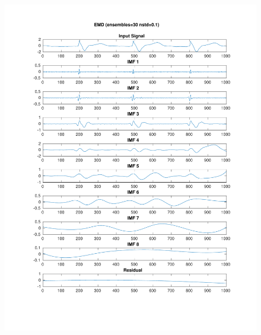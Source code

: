 \documentclass[11pt,a4paper]{article}
\begin{document}
\begin{figure}[H]
\centering
\begin{minipage}{0.48\textwidth}
	\centering
	\includegraphics[width=\textwidth]{fig/217l1_emd_ensemble.pdf}
\end{minipage}
\begin{minipage}{0.48\textwidth}
	\centering

\end{minipage}
\end{figure}
\end{document}

